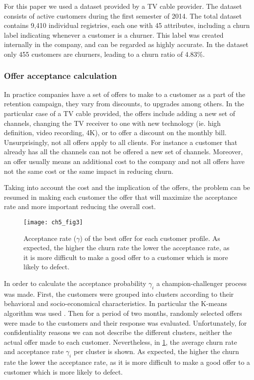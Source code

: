 	For this paper we used a dataset provided by a TV cable provider. 
	The dataset consists of active customers during the first semester of 2014. 	
	The total dataset contains 9,410 individual registries, each one with 45 attributes, 
	including a churn label indicating whenever a customer is a churner.
	This label was created internally in the company, and can be regarded as highly accurate. 
	In the dataset only 455 customers are churners, leading to a churn ratio of 4.83\%.
	
	\subsubsection{Offer acceptance calculation}

In practice companies have a set of offers to make to a customer as a part of the retention 
campaign, they vary from discounts, to upgrades among others. In the particular case of a TV cable 
provided, the offers include adding a new set of channels, changing the TV receiver to one with new 
technology (ie. high definition, video recording, 4K),  or to offer a discount on the monthly bill.
Unsurprisingly, not all offers apply to all clients. For instance a customer that already has all 
the channels can not be offered a new set of channels. 
Moreover, an offer usually means an additional cost to the company and not all offers have 
not the same cost or the same impact in reducing churn.

Taking into account the cost and the implication of the offers, the problem can be 
resumed in making each customer the offer that will maximize the acceptance rate and more 
important reducing the overall cost. 

	\begin{figure}[t!]
	  \centering
    \texttt{[image: ch5\_fig3]}
	  \caption{Acceptance rate ($\gamma$) of the best offer for each customer profile. As expected, 
		the higher the churn rate the lower the acceptance rate, as it is more difficult to make a 
		good offer to a customer which is more likely to defect. }
	  \label{fig:ch5:3}
	\end{figure}

In order to calculate the acceptance probability $\gamma_i$ a champion-challenger process was made. 
First, the customers were grouped into clusters according to 
their behavioral and socio-economical characteristics. In particular the K-means algorithm was used 
\citep{Marslan2009}.
Then for a period of two months, randomly selected offers 
were made to the customers and their response was evaluated.
Unfortunately, for confidentiality reasons we can not describe the different clusters, neither the 
actual offer made to each customer. Nevertheless, in \figurename{ \ref{fig:ch5:3}}, the average 
churn rate and acceptance rate $\gamma_i$ per cluster is shown. As expected, the higher the churn 
rate the lower the acceptance rate, as it is more difficult to make a good offer to a customer 
which is more likely to defect.


